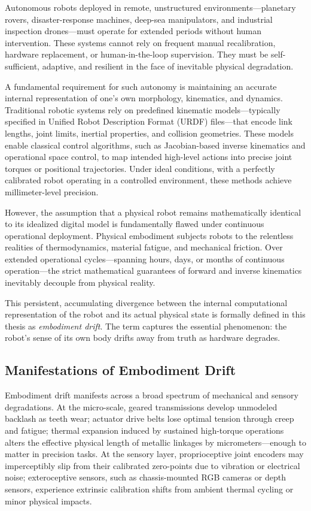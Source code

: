 \documentclass[12pt,a4paper,oneside]{report}
\begin{document}
Autonomous robots deployed in remote, unstructured environments---planetary rovers, disaster-response machines, deep-sea manipulators, and industrial inspection drones---must operate for extended periods without human intervention. These systems cannot rely on frequent manual recalibration, hardware replacement, or human-in-the-loop supervision. They must be self-sufficient, adaptive, and resilient in the face of inevitable physical degradation.

A fundamental requirement for such autonomy is maintaining an accurate internal representation of one's own morphology, kinematics, and dynamics. Traditional robotic systems rely on predefined kinematic models---typically specified in Unified Robot Description Format (URDF) files---that encode link lengths, joint limits, inertial properties, and collision geometries. These models enable classical control algorithms, such as Jacobian-based inverse kinematics and operational space control, to map intended high-level actions into precise joint torques or positional trajectories. Under ideal conditions, with a perfectly calibrated robot operating in a controlled environment, these methods achieve millimeter-level precision.

However, the assumption that a physical robot remains mathematically identical to its idealized digital model is fundamentally flawed under continuous operational deployment. Physical embodiment subjects robots to the relentless realities of thermodynamics, material fatigue, and mechanical friction. Over extended operational cycles---spanning hours, days, or months of continuous operation---the strict mathematical guarantees of forward and inverse kinematics inevitably decouple from physical reality.

This persistent, accumulating divergence between the internal computational representation of the robot and its actual physical state is formally defined in this thesis as \textit{embodiment drift}. The term captures the essential phenomenon: the robot's sense of its own body drifts away from truth as hardware degrades.

\subsection{Manifestations of Embodiment Drift}
\label{subsec:manifestations_embodiment_drift}

Embodiment drift manifests across a broad spectrum of mechanical and sensory degradations. At the micro-scale, geared transmissions develop unmodeled backlash as teeth wear; actuator drive belts lose optimal tension through creep and fatigue; thermal expansion induced by sustained high-torque operations alters the effective physical length of metallic linkages by micrometers---enough to matter in precision tasks. At the sensory layer, proprioceptive joint encoders may imperceptibly slip from their calibrated zero-points due to vibration or electrical noise; exteroceptive sensors, such as chassis-mounted RGB cameras or depth sensors, experience extrinsic calibration shifts from ambient thermal cycling or minor physical impacts.
\end{document}
